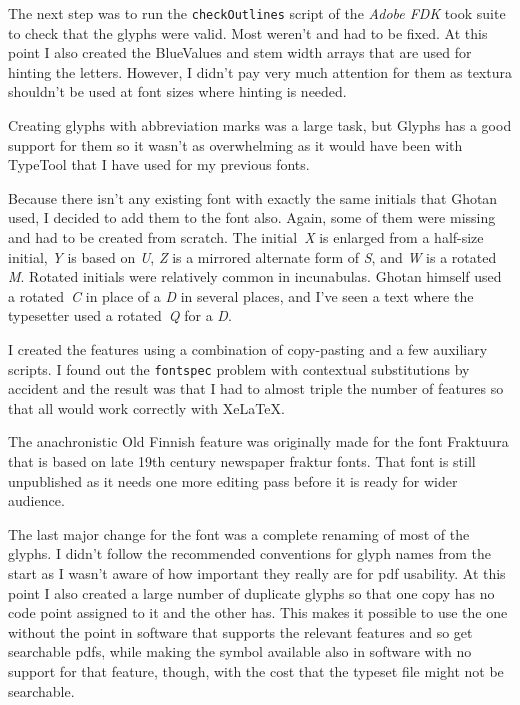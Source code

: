 \documentclass[a4paper, 12pt]{article}
\begin{document}
The next step was to run the \texttt{checkOutlines} script of the
\emph{Adobe FDK} took suite to check that the glyphs were valid. Most
weren't and had to be fixed. At this point I also created the
BlueValues and stem width arrays that are used for hinting the
letters. However, I didn't pay very much attention for them as textura
shouldn't be used at font sizes where hinting is needed.

Creating glyphs with abbreviation marks was a large task, but Glyphs
has a good support for them so it wasn't as overwhelming as it would
have been with TypeTool that I have used for my previous fonts. 

Because there isn't any existing font with exactly the same initials
that Ghotan used, I decided to add them to the font also. Again, some
of them were missing and had to be created from scratch. The
initial~\emph{X} is enlarged from a half-size initial, \emph{Y} is
based on \emph{U}, \emph{Z} is a mirrored alternate form of \emph{S},
and \emph{W} is a rotated \emph{M}. Rotated initials were relatively
common in incunabulas. Ghotan himself used a rotated~\emph{C} in place
of a \emph{D} in several places, and I've seen a text where the
typesetter used a rotated~\emph{Q} for a \emph{D}.

I created the features using a combination of copy-pasting and a few
auxiliary scripts. I found out the \texttt{fontspec} problem with
contextual substitutions by accident and the result was that I had to
almost triple the number of features so that all would work correctly
with XeLaTeX. 

The anachronistic Old Finnish feature was originally made for the font
Fraktuura that is based on late 19th century newspaper fraktur fonts.
That font is still unpublished as it needs one more editing pass
before it is ready for wider audience. 

The last major change for the font was a complete renaming of most of
the glyphs. I didn't follow the recommended conventions for glyph
names from the start as I wasn't aware of how important they really
are for pdf usability. At this point I also created a large number of
duplicate glyphs so that one copy has no code point assigned to it and
the other has. This makes it possible to use the one without the point
in software that supports the relevant features and so get searchable
pdfs, while making the symbol available also in software with no
support for that feature, though, with the cost that the typeset file
might not be searchable. 
\end{document}
